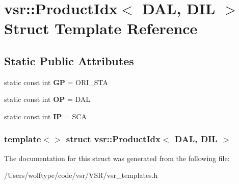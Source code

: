 \hypertarget{structvsr_1_1_product_idx_3_01_d_a_l_00_01_d_i_l_01_4}{\section{vsr\-:\-:Product\-Idx$<$ D\-A\-L, D\-I\-L $>$ Struct Template Reference}
\label{structvsr_1_1_product_idx_3_01_d_a_l_00_01_d_i_l_01_4}
}
\subsection*{Static Public Attributes}
\begin{DoxyCompactItemize}
\item 
\hypertarget{structvsr_1_1_product_idx_3_01_d_a_l_00_01_d_i_l_01_4_a80cba12290db4e12103924ab67bdf2db}{static const int {\bfseries G\-P} = O\-R\-I\-\_\-\-S\-T\-A}\label{structvsr_1_1_product_idx_3_01_d_a_l_00_01_d_i_l_01_4_a80cba12290db4e12103924ab67bdf2db}

\item 
\hypertarget{structvsr_1_1_product_idx_3_01_d_a_l_00_01_d_i_l_01_4_a507d6e13fd0225785a1720c65cfe1d63}{static const int {\bfseries O\-P} = D\-A\-L}\label{structvsr_1_1_product_idx_3_01_d_a_l_00_01_d_i_l_01_4_a507d6e13fd0225785a1720c65cfe1d63}

\item 
\hypertarget{structvsr_1_1_product_idx_3_01_d_a_l_00_01_d_i_l_01_4_ab420e548b863e06513672398ce53c6be}{static const int {\bfseries I\-P} = S\-C\-A}\label{structvsr_1_1_product_idx_3_01_d_a_l_00_01_d_i_l_01_4_ab420e548b863e06513672398ce53c6be}

\end{DoxyCompactItemize}
\subsubsection*{template$<$$>$ struct vsr\-::\-Product\-Idx$<$ D\-A\-L, D\-I\-L $>$}



The documentation for this struct was generated from the following file\-:\begin{DoxyCompactItemize}
\item 
/\-Users/wolftype/code/vsr/\-V\-S\-R/vsr\-\_\-templates.\-h\end{DoxyCompactItemize}
